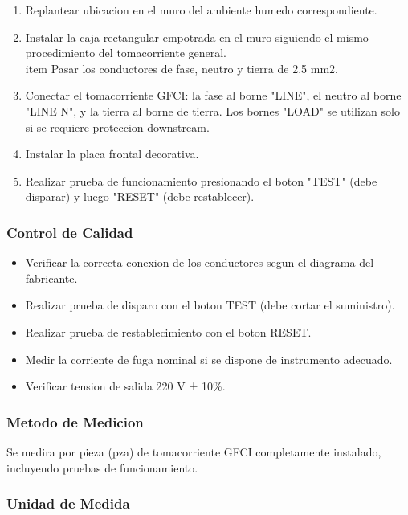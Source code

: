 \begin{enumerate}
  \item Replantear ubicacion en el muro del ambiente humedo correspondiente.
  \item Instalar la caja rectangular empotrada en el muro siguiendo el mismo procedimiento del tomacorriente general.
  \\item Pasar los conductores de fase, neutro y tierra de 2.5 mm2.
  \item Conectar el tomacorriente GFCI: la fase al borne "LINE", el neutro al borne "LINE N", y la tierra al borne de tierra. Los bornes "LOAD" se utilizan solo si se requiere proteccion downstream.
  \item Instalar la placa frontal decorativa.
  \item Realizar prueba de funcionamiento presionando el boton "TEST" (debe disparar) y luego "RESET" (debe restablecer).
\end{enumerate}

\subsubsection{Control de Calidad}

\begin{itemize}
  \item Verificar la correcta conexion de los conductores segun el diagrama del fabricante.
  \item Realizar prueba de disparo con el boton TEST (debe cortar el suministro).
  \item Realizar prueba de restablecimiento con el boton RESET.
  \item Medir la corriente de fuga nominal si se dispone de instrumento adecuado.
  \item Verificar tension de salida 220 V ± 10\%.
\end{itemize}

\subsubsection{Metodo de Medicion}

Se medira por pieza (pza) de tomacorriente GFCI completamente instalado, incluyendo pruebas de funcionamiento.

\subsubsection{Unidad de Medida}

